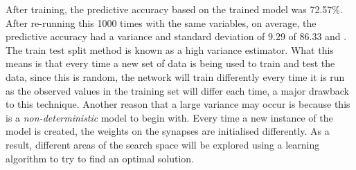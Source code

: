 \documentclass[11pt]{article}
\begin{document}
After training, the predictive accuracy based on the trained model was 72.57\%. After re-running this 1000 times with the same variables, on average, the predictive accuracy had a variance and standard deviation of 9.29 of 86.33 and . The train test split method is known as a high variance estimator. What this means is that every time a new set of data is being used to train and test the data, since this is random, the network will train differently every time it is run as the observed values in the training set will differ each time, a major drawback to this technique. Another reason that a large variance may occur is because this is a \textit{non-deterministic} model to begin with. Every time a new instance of the model is created, the weights on the synapses are initialised differently. As a result, different areas of the search space will be explored using a learning algorithm to try to find an optimal solution.
\end{document}

